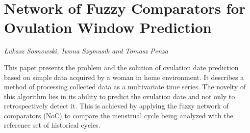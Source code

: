 \documentclass[../booklet.tex]{subfiles}
\begin{document}
\section[Network of Fuzzy Comparators for Ovulation Window Prediction. {\it Łukasz Sosnowski, Iwona Szymusik and Tomasz Penza}]{Network of Fuzzy Comparators for Ovulation Window Prediction}
  

\begin{center}
  {\it Łukasz Sosnowski, Iwona Szymusik and Tomasz Penza}
\end{center}

\vskip 0.8cm


This paper presents the problem and the solution of ovulation date prediction based on simple data acquired by a woman in home environment. It describes a method of processing collected data as a multivariate time series. The novelty of this algorithm lies in its ability to predict the ovulation date and not only to retrospectively detect it. This is achieved by applying the fuzzy network of comparators (NoC) to compare the menstrual cycle being analyzed with the reference set of historical cycles. 
\end{document}
